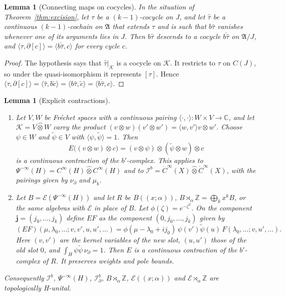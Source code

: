 \documentclass[11pt,oneside,reqno]{article}
\newcommand{\C}{\mathbb C}
\newcommand{\Z}{\mathbb Z}
\newcommand{\cE}{\mathcal E}
\newcommand{\Ib}{\mathcal I^b}
\newcommand{\Idb}{\mathcal I^b_\partial}
\theoremstyle{plain}
\newtheorem{lemma}[theorem]{Lemma}
\theoremstyle{definition}
\theoremstyle{remark}
\newcommand{\Lser}[1]{(\!(#1)\!)}
\begin{document}
\begin{lemma}[Connecting maps on cocycles]\label{lem:conn}
In the situation of Theorem~\ref{thm:excision}, let \(\tau\) be a
\((k-1)\)-cocycle on \(J\), and let \(\hat\tau\) be a continuous
\((k-1)\)-cochain on \(\mathfrak A\) that extends \(\tau\) and is such that
\(b\hat\tau\) vanishes whenever one of its arguments lies in \(J\). Then
\(b\hat\tau\) descends to a cocycle \(\overline{b\hat\tau}\) on
\(\mathfrak A/J\), and \(\langle\tau,\partial[c]\rangle=
\langle\overline{b\hat\tau},c\rangle\) for every cycle \(c\).
\end{lemma}

\begin{proof}
The hypothesis says that \(\hat\tau|_{\mathcal K}\) is a cocycle on
\(\mathcal K\). It restricts to \(\tau\) on \(C(J)\), so under the
quasi-isomorphism it represents \([\tau]\). Hence
\(\langle\tau,\partial[c]\rangle=\langle\hat\tau,b\tilde c\rangle=
\langle b\hat\tau,\tilde c\rangle=\langle\overline{b\hat\tau},c\rangle\).
\end{proof}

\begin{lemma}[Explicit contractions]\label{lem:Hunital}
\begin{enumerate}
\item[(a)] Let \(V,W\) be Fréchet spaces with a continuous pairing
\(\langle\cdot,\cdot\rangle:W\times V\to\C\), and let
\(\mathcal K=V\widehat\otimes W\) carry the product
\((v\otimes w)(v'\otimes w')=\langle w,v'\rangle v\otimes w'\). Choose
\(\psi\in W\) and \(\tilde\psi\in V\) with \(\langle\psi,\tilde\psi\rangle=1\).
Then
\[
 E\bigl((v\otimes w)\otimes c\bigr)=(v\otimes\psi)\otimes
 (\tilde\psi\otimes w)\otimes c
\]
is a continuous contraction of the \(b'\)-complex. This applies to
\(\Psi^{-\infty}(H)=C^\infty(H)\widehat\otimes C^\infty(H)\) and to
\(\Ib=\dot C^\infty(X)\widehat\otimes\dot C^\infty(X)\), with the pairings
given by \(\nu_\partial\) and \(\mu_b\).
\item[(b)] Let \(B=\cE(\Psi^{-\infty}(H))\) and let \(R\) be \(B\Lser{x;\alpha}\),
\(B\rtimes_\alpha\Z=\bigoplus_kx^kB\), or the same algebras with \(\cE\) in
place of \(B\). Let \(\phi(\zeta)=e^{-\zeta^2}\). On the component
\(\mathbf j=(j_0,\dots,j_k)\) define \(EF\) as the component
\((0,j_0,\dots,j_k)\) given by
\[
 (EF)(\mu,\lambda_0,\dots;v,v',u,u',\dots)
 =\phi(\mu-\lambda_0+ij_0)\,\psi(v')\tilde\psi(u)\,
 F(\lambda_0,\dots;v,u',\dots).
\]
Here \((v,v')\) are the kernel variables of the new slot, \((u,u')\) those
of the old slot \(0\), and \(\int_H\psi\tilde\psi\,\nu_\partial=1\). Then
\(E\) is a continuous contraction of the \(b'\)-complex of \(R\). It
preserves weights and pole bounds.
\end{enumerate}
Consequently \(\Ib\), \(\Psi^{-\infty}(H)\), \(\Idb\), \(B\rtimes_\alpha\Z\),
\(\cE\Lser{x;\alpha}\) and \(\cE\rtimes_\alpha\Z\) are topologically H-unital.
\end{lemma}
\end{document}
